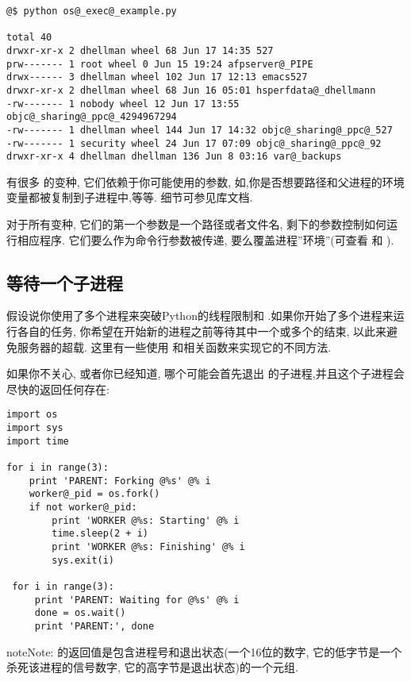 \documentclass[a4paper,10pt,english]{manual}
\begin{document}
\begin{Verbatim}[commandchars=@\[\]]
@$ python os@_exec@_example.py

total 40
drwxr-xr-x 2 dhellman wheel 68 Jun 17 14:35 527
prw------- 1 root wheel 0 Jun 15 19:24 afpserver@_PIPE
drwx------ 3 dhellman wheel 102 Jun 17 12:13 emacs527
drwxr-xr-x 2 dhellman wheel 68 Jun 16 05:01 hsperfdata@_dhellmann
-rw------- 1 nobody wheel 12 Jun 17 13:55 objc@_sharing@_ppc@_4294967294
-rw------- 1 dhellman wheel 144 Jun 17 14:32 objc@_sharing@_ppc@_527
-rw------- 1 security wheel 24 Jun 17 07:09 objc@_sharing@_ppc@_92
drwxr-xr-x 4 dhellman dhellman 136 Jun 8 03:16 var@_backups
\end{Verbatim}

有很多  的变种, 它们依赖于你可能使用的参数, 如,你是否想要路径和父进程的环境变量都被复制到子进程中,等等. 细节可参见库文档.

对于所有变种, 它们的第一个参数是一个路径或者文件名, 剩下的参数控制如何运行相应程序. 它们要么作为命令行参数被传递, 要么覆盖进程''环境''(可查看  和  ).


\subsection{等待一个子进程}

假设说你使用了多个进程来突破Python的线程限制和 .如果你开始了多个进程来运行各自的任务, 你希望在开始新的进程之前等待其中一个或多个的结束, 以此来避免服务器的超载. 这里有一些使用  和相关函数来实现它的不同方法.

如果你不关心, 或者你已经知道, 哪个可能会首先退出  的子进程,并且这个子进程会尽快的返回任何存在:

\begin{Verbatim}[commandchars=@\[\]]
import os
import sys
import time

for i in range(3):
    print 'PARENT: Forking @%s' @% i
    worker@_pid = os.fork()
    if not worker@_pid:
        print 'WORKER @%s: Starting' @% i
        time.sleep(2 + i)
        print 'WORKER @%s: Finishing' @% i
        sys.exit(i)

 for i in range(3):
     print 'PARENT: Waiting for @%s' @% i
     done = os.wait()
     print 'PARENT:', done
\end{Verbatim}

\begin{notice}{note}{Note:}
 的返回值是包含进程号和退出状态(一个16位的数字, 它的低字节是一个杀死该进程的信号数字, 它的高字节是退出状态)的一个元组.
\end{notice}
\end{document}
